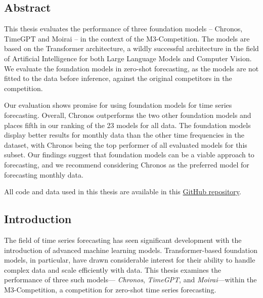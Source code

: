 \documentclass[12pt,a4paper]{article}
\begin{document}
\newpage
\begin{center}
 \section*{Abstract}
\end{center}

\begin{center}
  This thesis evaluates the performance of three foundation models – Chronos, TimeGPT and Moirai – in the context of the M3-Competition. The models are based on the Transformer architecture, a wildly successful architecture in the field of Artificial Intelligence for both Large Language Models and Computer Vision. We evaluate the foundation models in zero-shot forecasting, as the models are not fitted to the data before inference, against the original competitors in the competition. 

  Our evaluation shows promise for using foundation models for time series forecasting. Overall, Chronos outperforms the two other foundation models and places fifth in our ranking of the 23 models for all data. The foundation models display better results for monthly data than the other time frequencies in the dataset, with Chronos being the top performer of all evaluated models for this subset. Our findings suggest that foundation models can be a viable approach to forecasting, and we recommend considering Chronos as the preferred model for forecasting monthly data. 
  
  All code and data used in this thesis are available in this \href{https://github.com/tom-alten/OutsmartingTime/}{GitHub repository}.
  
\end{center}
\newpage

\hypersetup{
  linkcolor=black
}

\tableofcontents  %

\hypersetup{
  linkcolor=blue
}
\newpage          %

\begin{center}
  \section{Introduction}
\end{center}
The field of time series forecasting has seen significant development with the introduction of advanced machine learning models. Transformer-based foundation models, in particular, have drawn considerable interest for their ability to handle complex data and scale efficiently with data. This thesis examines the performance of three such models— \textit{Chronos}, \textit{TimeGPT}, and \textit{Moirai}—within the M3-Competition, a competition for zero-shot time series forecasting.
\end{document}
